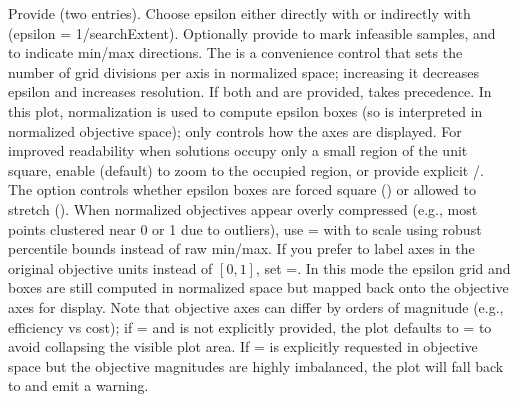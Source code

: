 Provide  (two entries). Choose epsilon either directly with  or indirectly with  (epsilon = 1/searchExtent).
Optionally provide  to mark infeasible samples, and  to indicate min/max directions.
The  is a convenience control that sets the number of grid divisions per axis in normalized space; increasing it decreases epsilon and increases resolution.
If both  and  are provided,  takes precedence.
In this plot, normalization is used to compute epsilon boxes (so  is interpreted in normalized objective space);  only controls how the axes are displayed.
For improved readability when solutions occupy only a small region of the unit square, enable  (default) to zoom to the occupied region,
or provide explicit /. The  option controls whether epsilon boxes are forced square () or allowed to stretch ().
When normalized objectives appear overly compressed (e.g., most points clustered near 0 or 1 due to outliers), use =
with  to scale using robust percentile bounds instead of raw min/max.
If you prefer to label axes in the original objective units instead of \([0,1]\), set =. In this mode the epsilon grid and boxes
are still computed in normalized space but mapped back onto the objective axes for display.
Note that objective axes can differ by orders of magnitude (e.g., efficiency vs cost); if = and  is not explicitly provided,
the plot defaults to = to avoid collapsing the visible plot area.
If = is explicitly requested in objective space but the objective magnitudes are highly imbalanced, the plot will fall back to  and emit a warning.

